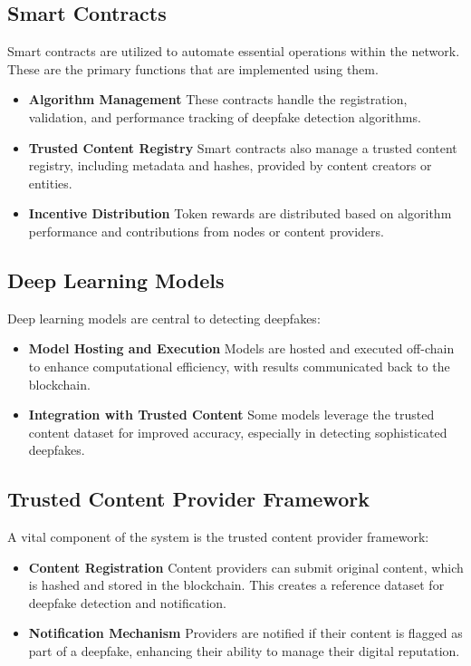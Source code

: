 \documentclass{article}
\begin{document}
\subsection{Smart Contracts}

Smart contracts are utilized to automate essential operations within the network. These are the primary functions that are implemented using them.

\begin{itemize}
    \item \textbf{Algorithm Management} These contracts handle the registration, validation, and performance tracking of deepfake detection algorithms.
    \item \textbf{Trusted Content Registry} Smart contracts also manage a trusted content registry, including metadata and hashes, provided by content creators or entities.
    \item \textbf{Incentive Distribution} Token rewards are distributed based on algorithm performance and contributions from nodes or content providers.
\end{itemize}

\subsection{Deep Learning Models}

Deep learning models are central to detecting deepfakes:

\begin{itemize}
    \item \textbf{Model Hosting and Execution} Models are hosted and executed off-chain to enhance computational efficiency, with results communicated back to the blockchain.
    \item \textbf{Integration with Trusted Content} Some models leverage the trusted content dataset for improved accuracy, especially in detecting sophisticated deepfakes.
\end{itemize}

\subsection{Trusted Content Provider Framework}

A vital component of the system is the trusted content provider framework:

\begin{itemize}
    \item \textbf{Content Registration} Content providers can submit original content, which is hashed and stored in the blockchain. This creates a reference dataset for deepfake detection and notification.
    \item \textbf{Notification Mechanism} Providers are notified if their content is flagged as part of a deepfake, enhancing their ability to manage their digital reputation.
\end{itemize}
\end{document}
